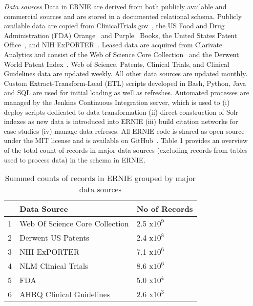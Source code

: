 \documentclass[review]{elsarticle}
\begin{document}
\emph{Data sources} Data in ERNIE are derived from both publicly available and commercial sources and are stored in a documented relational schema. Publicly available data are copied from ClinicalTrials.gov~\cite{ClinicalTrials2017},  the US Food and Drug Administration (FDA) Orange~\cite{OrangeBook2017} and Purple~\cite{PurpleBook2017} Books, the United States Patent Office~\cite{USPTO2017}, and NIH ExPORTER~\cite{NIHExporter2017}. Leased data are acquired from Clarivate Analytics and consist of the Web of Science Core Collection~\cite{WoS2017} and the Derwent World Patent Index~\cite{DWPI2017}. Web of Science, Patents, Clinical Trials, and Clinical Guidelines data are updated weekly. All other data sources are updated monthly.  Custom Extract-Transform-Load (ETL) scripts developed in Bash, Python, Java and SQL are used for initial loading as well as refreshes. Automated processes are managed by the Jenkins Continuous Integration server, which is used to (i) deploy scripts dedicated to data transformation (ii) direct construction of Solr indexes as new data is introduced into ERNIE (iii) build citation networks for case studies (iv) manage data refreses. All ERNIE code is shared as open-source under the MIT license and is available on GitHub~\cite{GithubERNIE2017}. Table 1 provides an overview of the total count of records in major data sources (excluding records from tables used to process data) in the schema in ERNIE. %

\begin{table}[ht]
\begin{tabular}{rll}
  \hline
 & Data Source & No of Records \\ 
  \hline
1 & Web Of Science Core Collection & 2.5 x$10^{9}$\\ 
  2 & Derwent US Patents & 2.4 x$10^{8}$\\
  3 & NIH ExPORTER & 7.1 x$10^{6}$ \\ 
  4 & NLM Clinical Trials & 8.6 x$10^{6}$ \\ 
  5 &  FDA & 5.0 x$10^{4}$\\  
  6 & AHRQ Clinical Guidelines & 2.6 x$10^{3}$ \\ 
   \hline
\end{tabular}
\caption {Summed counts of records in ERNIE grouped by major data sources}
\end{table}
\end{document}

